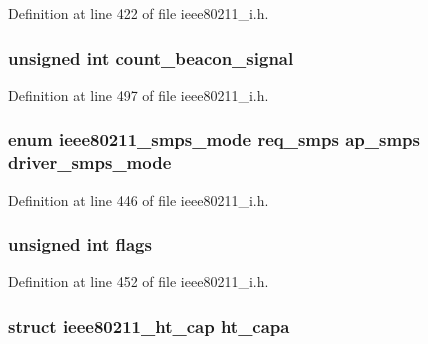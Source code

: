 Definition at line 422 of file ieee80211\-\_\-i.\-h.

\hypertarget{structieee80211__if__managed_a896df829a69357f4258722027c1dbc6d}{
\subsubsection[{count\-\_\-beacon\-\_\-signal}]{\setlength{\rightskip}{0pt plus 5cm}unsigned int count\-\_\-beacon\-\_\-signal}}\label{structieee80211__if__managed_a896df829a69357f4258722027c1dbc6d}


Definition at line 497 of file ieee80211\-\_\-i.\-h.

\hypertarget{structieee80211__if__managed_a898549726b20c8fd129d59974daf9c90}{
\subsubsection[{driver\-\_\-smps\-\_\-mode}]{\setlength{\rightskip}{0pt plus 5cm}enum ieee80211\-\_\-smps\-\_\-mode req\-\_\-smps ap\-\_\-smps driver\-\_\-smps\-\_\-mode}}\label{structieee80211__if__managed_a898549726b20c8fd129d59974daf9c90}


Definition at line 446 of file ieee80211\-\_\-i.\-h.

\hypertarget{structieee80211__if__managed_ac92588540e8c1d014a08cd8a45462b19}{
\subsubsection[{flags}]{\setlength{\rightskip}{0pt plus 5cm}unsigned int flags}}\label{structieee80211__if__managed_ac92588540e8c1d014a08cd8a45462b19}


Definition at line 452 of file ieee80211\-\_\-i.\-h.

\hypertarget{structieee80211__if__managed_ac49151818a5396f2513b2cf6f135e988}{
\subsubsection[{ht\-\_\-capa}]{\setlength{\rightskip}{0pt plus 5cm}struct ieee80211\-\_\-ht\-\_\-cap ht\-\_\-capa}}\label{structieee80211__if__managed_ac49151818a5396f2513b2cf6f135e988}


